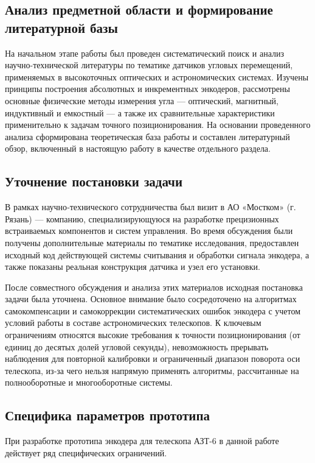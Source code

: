 \subsection{Анализ предметной области и формирование литературной базы}

На начальном этапе работы был проведен систематический поиск и анализ научно-технической литературы по тематике датчиков угловых перемещений, применяемых в высокоточных оптических и астрономических системах. Изучены принципы построения абсолютных и инкрементных энкодеров, рассмотрены основные физические методы измерения угла — оптический, магнитный, индуктивный и емкостный — а также их сравнительные характеристики применительно к задачам точного позиционирования. На основании проведенного анализа сформирована теоретическая база работы и составлен литературный обзор, включенный в настоящую работу в качестве отдельного раздела.

\subsection{Уточнение постановки задачи}
В рамках научно‑технического сотрудничества был визит в АО «Мостком» (г. Рязань) — компанию, специализирующуюся на разработке прецизионных встраиваемых компонентов и систем управления. Во время обсуждения были получены дополнительные материалы по тематике исследования, предоставлен исходный код действующей системы считывания и обработки сигнала энкодера, а также показаны реальная конструкция датчика и узел его установки.

После совместного обсуждения и анализа этих материалов исходная постановка задачи была уточнена. Основное внимание было сосредоточено на алгоритмах самокомпенсации и самокоррекции систематических ошибок энкодера с учетом условий работы в составе астрономических телескопов. К ключевым ограничениям относятся высокие требования к точности позиционирования (от единиц до десятых долей угловой секунды), невозможность прерывать наблюдения для повторной калибровки и ограниченный диапазон поворота оси телескопа, из‑за чего нельзя напрямую применять алгоритмы, рассчитанные на полнооборотные и многооборотные системы.

\subsection{Специфика параметров прототипа}

При разработке прототипа энкодера для телескопа АЗТ-6 в данной работе действует ряд специфических ограничений.


